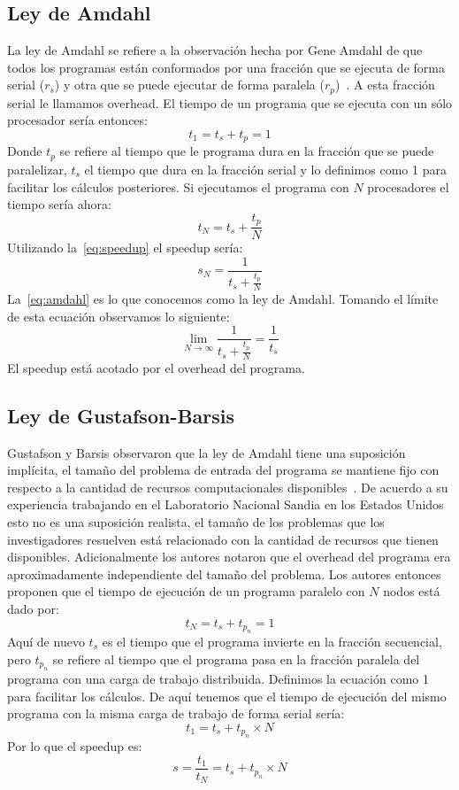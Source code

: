 \subsection{Ley de Amdahl}
La ley de Amdahl se refiere a la observación hecha por Gene Amdahl de que todos los programas están conformados por una fracción que se ejecuta de forma serial ($r_s$) y otra que se puede ejecutar de forma paralela ($r_p$)~\cite{amdahl1967}. A esta fracción serial le llamamos overhead. El tiempo de un programa que se ejecuta con un sólo procesador sería entonces:
$$t_1 = t_s + t_p = 1$$
Donde $t_p$ se refiere al tiempo que le programa dura en la fracción que se puede paralelizar, $t_s$ el tiempo que dura en la fracción serial y lo definimos como 1 para facilitar los cálculos posteriores.
Si ejecutamos el programa con $N$ procesadores el tiempo sería ahora:
$$t_N = t_s + \frac{t_p}{N}$$
Utilizando la~\cref{eq:speedup} el speedup sería:
\begin{equation}
  s_N = \frac{1}{t_s + \frac{t_p}{N}}
  \label{eq:amdahl}
\end{equation}
La~\cref{eq:amdahl} es lo que conocemos como la ley de Amdahl. Tomando el límite de esta ecuación observamos lo siguiente:
$$\lim_{N\to\infty} \frac{1}{t_s + \frac{t_p}{N}} = \frac{1}{t_s}$$
El speedup está acotado por el overhead del programa.
\subsection{Ley de Gustafson-Barsis}
Gustafson y Barsis observaron que la ley de Amdahl tiene una suposición implícita, el tamaño del problema de entrada del programa se mantiene fijo con respecto a la cantidad de recursos computacionales disponibles~\cite{Gustafson1988}. De acuerdo a su experiencia trabajando en el Laboratorio Nacional Sandia en los Estados Unidos esto no es una suposición realista, el tamaño de los problemas que los investigadores resuelven está relacionado con la cantidad de recursos que tienen disponibles. Adicionalmente los autores notaron que el overhead del programa era aproximadamente independiente del tamaño del problema. Los autores entonces proponen que el tiempo de ejecución de un programa paralelo con $N$ nodos está dado por:
$$t_N = t_s + t_{p_n} = 1$$
Aquí de nuevo $t_s$ es el tiempo que el programa invierte en la fracción secuencial, pero $t_{p_n}$ se refiere al tiempo que el programa pasa en la fracción paralela del programa con una carga de trabajo distribuida. Definimos la ecuación como 1 para facilitar los cálculos.
De aquí tenemos que el tiempo de ejecución del mismo programa con la misma carga de trabajo de forma serial sería:
$$t_1 = t_s + t_{p_n}\times N$$
Por lo que el speedup es:
\begin{equation}
  s = \frac{t_1}{t_N} = t_s + t_{p_n}\times N
  \label{eq:gustafson}
\end{equation}

